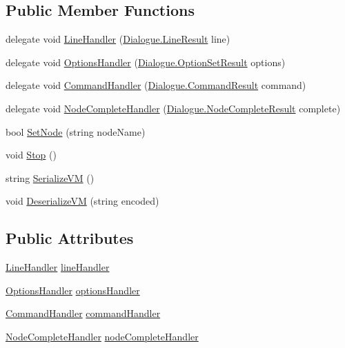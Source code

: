 \subsection*{Public Member Functions}
\begin{DoxyCompactItemize}
\item 
delegate void \hyperlink{a00072_aac9ec1011ea2c01460044d7c8355f398}{Line\-Handler} (\hyperlink{a00050}{Dialogue.\-Line\-Result} line)
\item 
delegate void \hyperlink{a00072_a78dfd54b743e53078eed19ab7be2b6cf}{Options\-Handler} (\hyperlink{a00060}{Dialogue.\-Option\-Set\-Result} options)
\item 
delegate void \hyperlink{a00072_a1b57359378059b134ba76acddafd8d81}{Command\-Handler} (\hyperlink{a00027}{Dialogue.\-Command\-Result} command)
\item 
delegate void \hyperlink{a00072_a5bf3aa51578847c18191fec665a840f9}{Node\-Complete\-Handler} (\hyperlink{a00055}{Dialogue.\-Node\-Complete\-Result} complete)
\item 
bool \hyperlink{a00072_a6364593ea1115d65e34b343422cfbbbd}{Set\-Node} (string node\-Name)
\item 
void \hyperlink{a00072_a78b8c4078471af59ba505c28824d84d1}{Stop} ()
\item 
string \hyperlink{a00072_ae66d8c267611573b649233f511beb646}{Serialize\-V\-M} ()
\item 
void \hyperlink{a00072_a52055e419ba627f0788ad3f6d0f9cb1c}{Deserialize\-V\-M} (string encoded)
\end{DoxyCompactItemize}
\subsection*{Public Attributes}
\begin{DoxyCompactItemize}
\item 
\hyperlink{a00072_aac9ec1011ea2c01460044d7c8355f398}{Line\-Handler} \hyperlink{a00072_a29b30454f068fc7e107d48bff4346fd9}{line\-Handler}
\item 
\hyperlink{a00072_a78dfd54b743e53078eed19ab7be2b6cf}{Options\-Handler} \hyperlink{a00072_acd25fe2e3aa90dc87ba25d9af904465b}{options\-Handler}
\item 
\hyperlink{a00072_a1b57359378059b134ba76acddafd8d81}{Command\-Handler} \hyperlink{a00072_ab89b02227b92c74552f719afd47848e4}{command\-Handler}
\item 
\hyperlink{a00072_a5bf3aa51578847c18191fec665a840f9}{Node\-Complete\-Handler} \hyperlink{a00072_a5129c63e67e2d4e2780d86b8351320a2}{node\-Complete\-Handler}
\end{DoxyCompactItemize}
